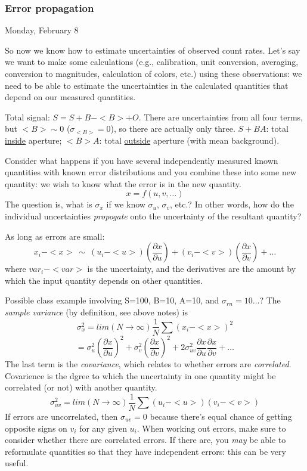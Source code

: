 \documentclass[12pt]{article}
\begin{document}
\textcolor{om}{\emph{}}

\subsubsection{Error propagation}
\textcolor{date}{Monday, February 8}

So now we know how to estimate uncertainties of observed count rates.
Let's say we want to make some calculations (e.g., calibration, unit
conversion, averaging, conversion to magnitudes, calculation of
colors, etc.) using these observations: we need to be able to estimate
the uncertainties in the calculated quantities that depend on our
measured quantities.

\textcolor{myBlue}{%
Total signal: $ S=S+B-<B>+O $. There are uncertainties from all
four terms, but $<B> \sim 0$ ($\sigma_{<B>}=0$), so there are
actually only three. $S+BA$: total \underline{inside} aperture;
$<B>A$: total \underline{outside} aperture (with mean background).}

Consider what happens if you have several independently measured
known quantities with known
error distributions and you combine these into some new quantity: we
wish to know what the error is in the new quantity.
    $$ x = f(u, v, \ldots) $$
The question is, what is $\sigma_x$ if we know
$\sigma_u$, $\sigma_v$, etc.?
\textcolor{myBlue}{In other words, how do the individual uncertainties
\emph{propogate} onto the uncertainty of the resultant quantity?}

As long as errors are small:
    $$ x_i - <x> \ \sim \
        (u_i - <u>)\left(\frac{\partial x}{\partial u}\right)
       + (v_i - <v>)\left( \frac{\partial x}{\partial v}  \right)
       + \ldots  $$
where $var_i - <var>$ is the uncertainty, and the derivatives are the
amount by which the input quantity depends on other quantities.

\textcolor{myBlue}{%
Possible class example involving
S=100, B=10, A=10, and $\sigma_{rn}=10\ldots$?
The \emph{sample variance} (by definition, see above notes) is}
    $$ \sigma_x^2 = lim(N \rightarrow \infty)\frac{1}{N}
       \sum(x_i - <x>)^2 $$
    $$ = \sigma_u^2\left(\frac{\partial x}{\partial u}\right)^2
       + \sigma_v^2\left(\frac{\partial x}{\partial v}\right)^2
       + 2\sigma_{uv}^2\frac{\partial x}{\partial u}
         \frac{\partial x}{\partial v} + \ldots $$
The last term is the \emph{covariance}, which relates to whether
errors are \emph{correlated}.
\textcolor{myBlue}{Covarience is the dgree to which the uncertainty
in one quantity might be correlated (or not) with another quantity}.
    $$ \sigma_{uv}^2 = lim(N \rightarrow\infty)\frac{1}{N}
       \sum(u_i - <u>)(v_i - <v>)  $$
If errors are uncorrelated, then $\sigma_{uv} = 0$ because there's
equal chance of getting opposite signs on $v_i$ for any given $u_i$.
When working out errors, make sure to consider whether there are
correlated errors. If there are, you \emph{may} be able to reformulate
quantities so that they have independent errors: this can be very
useful.
\end{document}
